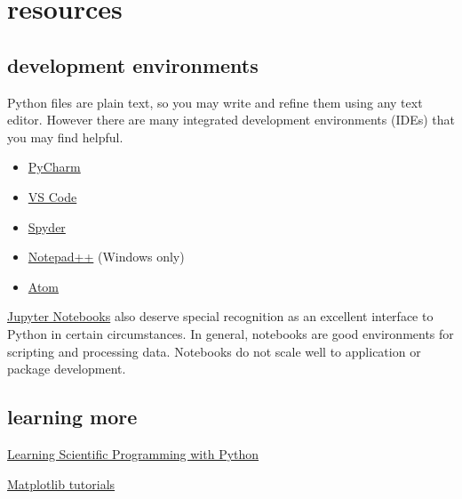 \documentclass{training}
\begin{document}
\clearpage
\section{resources}

\subsection*{development environments}

Python files are plain text, so you may write and refine them using any text editor.
However there are many integrated development environments (IDEs) that you may find helpful.
\begin{itemize}
  \item \href{https://www.jetbrains.com/pycharm/}{PyCharm}
  \item \href{https://code.visualstudio.com/}{VS Code}
  \item \href{https://www.spyder-ide.org/}{Spyder}
  \item \href{https://notepad-plus-plus.org/}{Notepad++} (Windows only)
  \item \href{https://atom.io/}{Atom}
\end{itemize}

\href{https://jupyter.org/}{Jupyter Notebooks} also deserve special recognition as an excellent interface to Python in certain circumstances.
In general, notebooks are good environments for scripting and processing data.
Notebooks do not scale well to application or package development.

\subsection*{learning more}

\href{https://scipython.com/}{Learning Scientific Programming with Python}

\href{https://matplotlib.org/3.2.1/tutorials/index.html}{Matplotlib tutorials}
\end{document}
